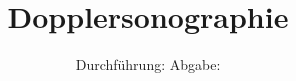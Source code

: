 
\subject{US3}
\title{Dopplersonographie}
\date{
  Durchführung:
  \hspace{3em}
  Abgabe:
}



\maketitle
\newpage
\mbox{}
\newpage
\thispagestyle{empty}
\tableofcontents
\newpage






\nocite{numpy}
\nocite{matplotlib}
\nocite{uncertainties}
\printbibliography


